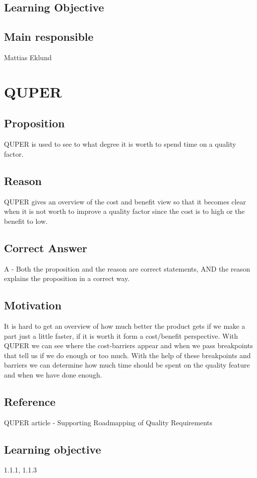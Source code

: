 \documentclass[a4paper]{article}
\begin{document}
	\subsection{Learning Objective}
	\subsection{Main responsible}
		Mattias Eklund



\section{QUPER}
\subsection*{Proposition}
QUPER is used to see to what degree it is worth to spend time on a quality factor.
\subsection*{Reason}
QUPER gives an overview of the cost and benefit view so that it becomes clear when it is not worth to improve a quality factor since the cost is to high or the benefit to low.
\subsection*{Correct Answer}
A - Both the proposition and the reason are correct statements,
AND the reason explains the proposition in a correct way. 
\subsection*{Motivation}
It is hard to get an overview of how much better the product gets if we make a part just a little faster, if it is worth it form a cost/benefit perspective. With QUPER we can see where the cost-barriers appear and when we pass breakpoints that tell us if we do enough or too much. With the help of these breakpoints and barriers we can determine how much time should be spent on the quality feature and when we have done enough.
\subsection*{Reference}
QUPER article - Supporting Roadmapping of Quality Requirements
\subsection*{Learning objective}
1.1.1, 1.1.3
\end{document}
